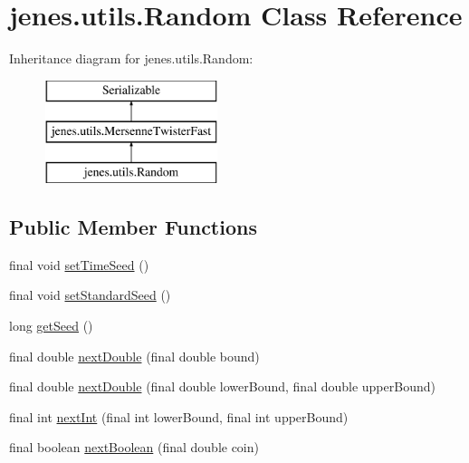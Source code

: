 \hypertarget{classjenes_1_1utils_1_1_random}{\section{jenes.\-utils.\-Random Class Reference}
\label{classjenes_1_1utils_1_1_random}
}
Inheritance diagram for jenes.\-utils.\-Random\-:\begin{figure}[H]
\begin{center}
\leavevmode
\includegraphics[height=3.000000cm]{classjenes_1_1utils_1_1_random}
\end{center}
\end{figure}
\subsection*{Public Member Functions}
\begin{DoxyCompactItemize}
\item 
final void \hyperlink{classjenes_1_1utils_1_1_random_a6eec3abcf133f7ce43d6a13441523a01}{set\-Time\-Seed} ()
\item 
final void \hyperlink{classjenes_1_1utils_1_1_random_a484017ff9c5473f7fc3fc7b52cb92433}{set\-Standard\-Seed} ()
\item 
long \hyperlink{classjenes_1_1utils_1_1_random_a55f9b0a836c137e520658f55ad806859}{get\-Seed} ()
\item 
final double \hyperlink{classjenes_1_1utils_1_1_random_abe2919ddf9245e0576591fa0ea26593f}{next\-Double} (final double bound)
\item 
final double \hyperlink{classjenes_1_1utils_1_1_random_a19babaa9c19de0243430cef2c445df9c}{next\-Double} (final double lower\-Bound, final double upper\-Bound)
\item 
final int \hyperlink{classjenes_1_1utils_1_1_random_ab066d2d2f6d32c89598c552a9dadedc0}{next\-Int} (final int lower\-Bound, final int upper\-Bound)
\item 
final boolean \hyperlink{classjenes_1_1utils_1_1_random_a16e9050a46f8218ec8e0f73c6456a5db}{next\-Boolean} (final double coin)
\end{DoxyCompactItemize}
